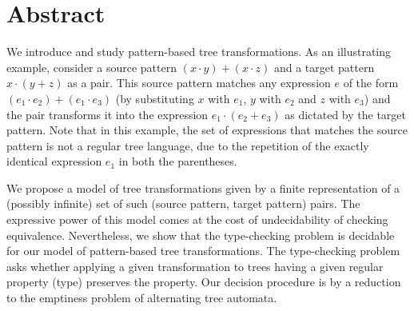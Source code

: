 \section{Abstract}\label{sec:abstract-trees}

We introduce and study pattern-based tree transformations. As an illustrating example, consider a source pattern $(x \cdot y) + (x \cdot z)$ and a target pattern $x \cdot (y + z)$ as a pair. This source pattern matches any expression $e$ of the form $(e_1 \cdot  e_2) + (e_1 \cdot  e_3)$ (by substituting $x$ with $e_1$, $y$ with $e_2$ and $z$ with $e_3$) and the pair transforms it into the expression $e_1 \cdot (e_2 + e_3)$ as dictated by the target pattern. Note that in this example, the set of expressions that matches the source pattern is not a regular tree language, due to the repetition of the exactly identical expression $e_1$ in both the parentheses.

We propose a model of tree transformations given by a finite representation of a (possibly infinite) set of such (source pattern, target pattern) pairs. The expressive power of this model comes at the cost of undecidability of checking equivalence. Nevertheless, we show that the type-checking problem is decidable for our model of pattern-based tree transformations. The type-checking problem asks whether applying a given transformation to trees having a given regular property (type) preserves the property. Our decision procedure is by a reduction to the emptiness problem of alternating tree automata.   
